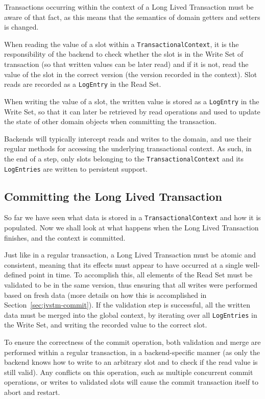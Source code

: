 Transactions occurring within the context of a Long Lived Transaction
must be aware of that fact, as this means that the semantics of domain
getters and setters is changed.

When reading the value of a slot within a
\texttt{TransactionalContext}, it is the responsibility of the backend
to check whether the slot is in the Write Set of transaction (so that
written values can be later read) and if it is not, read the value of
the slot in the correct version (the version recorded in the
context). Slot reads are recorded as a \texttt{LogEntry} in the Read
Set.

When writing the value of a slot, the written value is stored as a
\texttt{LogEntry} in the Write Set, so that it can later be retrieved
by read operations and used to update the state of other domain
objects when committing the transaction.

Backends will typically intercept reads and writes to the domain, and
use their regular methods for accessing the underlying transactional
context. As such, in the end of a step, only slots belonging to the
\texttt{TransactionalContext} and its \texttt{LogEntries} are written
to persistent support.

\subsection{Committing the Long Lived Transaction}

So far we have seen what data is stored in a
\texttt{TransactionalContext} and how it is populated. Now we shall
look at what happens when the Long Lived Transaction finishes, and the
context is committed.

Just like in a regular transaction, a Long Lived Transaction must be
atomic and consistent, meaning that its effects must appear to have
occurred at a single well-defined point in time. To accomplish this,
all elements of the Read Set must be validated to be in the same
version, thus ensuring that all writes were performed based on fresh
data (more details on how this is accomplished in
Section~\ref{sec:jvstm-commit}). If the validation step is successful,
all the written data must be merged into the global context, by
iterating over all \texttt{LogEntries} in the Write Set, and writing
the recorded value to the correct slot.

To ensure the correctness of the commit operation, both validation and
merge are performed within a regular transaction, in a
backend-specific manner (as only the backend knows how to write to an
arbitrary slot and to check if the read value is still valid). Any
conflicts on this operation, such as multiple concurrent commit
operations, or writes to validated slots will cause the commit
transaction itself to abort and restart.

